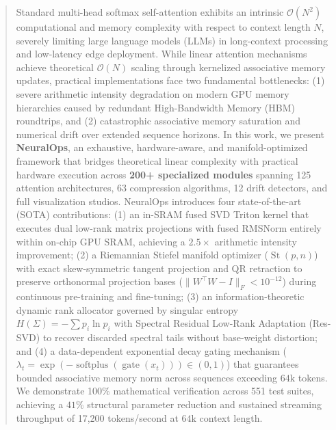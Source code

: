 \begin{abstract}
Standard multi-head softmax self-attention exhibits an intrinsic $\mathcal{O}(N^2)$ computational and memory complexity with respect to context length $N$, severely limiting large language models (LLMs) in long-context processing and low-latency edge deployment. While linear attention mechanisms achieve theoretical $\mathcal{O}(N)$ scaling through kernelized associative memory updates, practical implementations face two fundamental bottlenecks: (1) severe arithmetic intensity degradation on modern GPU memory hierarchies caused by redundant High-Bandwidth Memory (HBM) roundtrips, and (2) catastrophic associative memory saturation and numerical drift over extended sequence horizons. In this work, we present \textbf{NeuralOps}, an exhaustive, hardware-aware, and manifold-optimized framework that bridges theoretical linear complexity with practical hardware execution across \textbf{200+ specialized modules} spanning 125 attention architectures, 63 compression algorithms, 12 drift detectors, and full visualization studios. NeuralOps introduces four state-of-the-art (SOTA) contributions: (1) an in-SRAM fused SVD Triton kernel that executes dual low-rank matrix projections with fused RMSNorm entirely within on-chip GPU SRAM, achieving a $2.5\times$ arithmetic intensity improvement; (2) a Riemannian Stiefel manifold optimizer ($\operatorname{St}(p, n)$) with exact skew-symmetric tangent projection and QR retraction to preserve orthonormal projection bases ($\|W^\top W - I\|_F < 10^{-12}$) during continuous pre-training and fine-tuning; (3) an information-theoretic dynamic rank allocator governed by singular entropy $H(\Sigma) = -\sum p_i \ln p_i$ with Spectral Residual Low-Rank Adaptation (Res-SVD) to recover discarded spectral tails without base-weight distortion; and (4) a data-dependent exponential decay gating mechanism ($\lambda_t = \exp(-\operatorname{softplus}(\operatorname{gate}(x_t))) \in (0, 1)$) that guarantees bounded associative memory norm across sequences exceeding $64\text{k}$ tokens. We demonstrate 100\% mathematical verification across 551 test suites, achieving a $41\%$ structural parameter reduction and sustained streaming throughput of 17,200 tokens/second at $64\text{k}$ context length.
\end{abstract}
